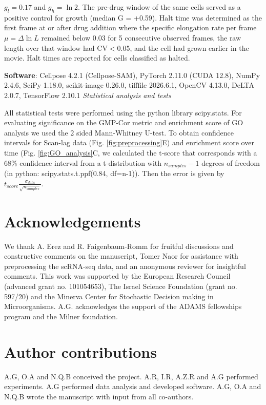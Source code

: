 \documentclass[12pt]{article}
\begin{document}
\begin{enumerate}
$g_{l}=0.17$ and $g_{h}=\ln{2}$. The pre-drug window of the same cells served as a positive control for growth (median G = +0.59). Halt time was determined as the first frame at or after drug addition where the specific elongation rate per frame $\mu = \Delta\ln L$ remained below 0.03 for 5 consecutive observed frames, the raw length over that window had CV$<$0.05, and the cell had grown earlier in the movie. Halt times are reported for cells classified as halted.
\end{enumerate}
\textbf{Software}: Cellpose 4.2.1 (Cellpose-SAM), PyTorch 2.11.0 (CUDA 12.8), NumPy 2.4.6, SciPy 1.18.0, scikit-image 0.26.0, tifffile 2026.6.1, OpenCV 4.13.0, DeLTA 2.0.7, TensorFlow 2.10.1
\vspace{0.5cm}
\newline
\textit{Statistical analysis and tests}
\par
All statistical tests were performed using the python library scipy.stats. For evaluating significance on the GMP-Cor metric and enrichment score of GO analysis we used the 2 sided Mann-Whitney U-test. To obtain confidence intervals for Scan-lag data (Fig. \ref{fig:preprocessing}E) and enrichment score over time (Fig. \ref{fig:GO_analysis}C, we calculated the t-score that corresponds with a 68\% confidence interval from a t-distribution with $n_{samples}-1$ degrees of freedom (in python: scipy.stats.t.ppf(0.84, df=n-1)). Then the error is given by $t_{score}\frac{\sigma_{data}}{\sqrt{n_{samples}}}$.

\section*{Acknowledgements}
We thank A. Erez and R. Faigenbaum-Romm for fruitful discussions and constructive comments on the manuscript, Tomer Naor for assistance with preprocessing the scRNA-seq data, and an anonymous reviewer for insightful comments. This work was supported by the European Research Council (advanced grant no. 101054653), The Israel Science Foundation (grant no. 597/20) and the Minerva Center for Stochastic Decision making in Microorganisms. A.G. acknowledges the support of the ADAMS fellowships program and the Milner foundation.
\section*{Author contributions}
A.G, O.A and N.Q.B conceived the project. A.R, I.R, A.Z.R and A.G performed experiments. A.G performed data analysis and developed software. A.G, O.A and N.Q.B wrote the manuscript with input from all co-authors.
\end{document}
